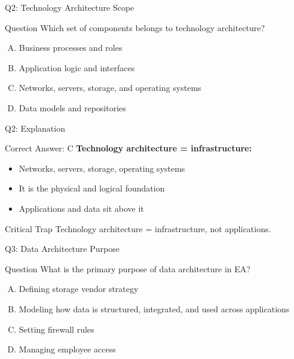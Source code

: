 \documentclass{beamer}
\begin{document}
	\begin{frame}{Q2: Technology Architecture Scope}
		\begin{block}{Question}
			Which set of components belongs to technology architecture?
		\end{block}
		\begin{enumerate}[(A)]
			\item Business processes and roles
			\item Application logic and interfaces
			\item Networks, servers, storage, and operating systems
			\item Data models and repositories
		\end{enumerate}
	\end{frame}
	
	\begin{frame}{Q2: Explanation}
		\begin{block}{Correct Answer: C}
			\textbf{Technology architecture = infrastructure:}
			\begin{itemize}
				\item Networks, servers, storage, operating systems
				\item It is the physical and logical foundation
				\item Applications and data sit above it
			\end{itemize}
		\end{block}
		\begin{alertblock}{Critical Trap}
			Technology architecture = infrastructure, not applications.
		\end{alertblock}
	\end{frame}
	
	\begin{frame}{Q3: Data Architecture Purpose}
		\begin{block}{Question}
			What is the primary purpose of data architecture in EA?
		\end{block}
		\begin{enumerate}[(A)]
			\item Defining storage vendor strategy
			\item Modeling how data is structured, integrated, and used across applications
			\item Setting firewall rules
			\item Managing employee access
		\end{enumerate}
	\end{frame}
	
\end{document}
